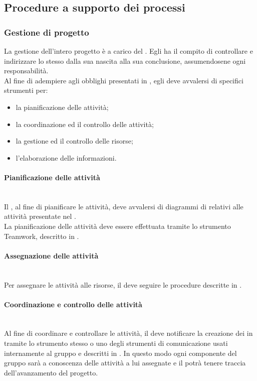 \subsection{Procedure a supporto dei processi}

\subsubsection{Gestione di progetto}
La gestione dell'intero progetto è a carico del \Responsabile. Egli ha il compito di controllare e indirizzare lo stesso dalla sua nascita alla sua conclusione, assumendosene ogni responsabilità.\\
Al fine di adempiere agli obblighi presentati in , egli deve avvalersi di specifici strumenti per:
\begin{itemize}
	\item la pianificazione delle attività;
	\item la coordinazione ed il controllo delle attività;
	\item la gestione ed il controllo delle risorse;
	\item l'elaborazione delle informazioni.
\end{itemize}

\paragraph{Pianificazione delle attività}\mbox{}\\
Il \Responsabile, al fine di pianificare le attività, deve avvalersi di diagrammi di  relativi alle attività presentate nel \PianoDiProgetto.\\
La pianificazione delle attività deve essere effettuata tramite lo strumento Teamwork, descritto in .

\paragraph{Assegnazione delle attività}\mbox{}\\
Per assegnare le attività alle risorse, il \Responsabile{} deve seguire le procedure descritte in .

\paragraph{Coordinazione e controllo delle attività}\mbox{}\\
Al fine di coordinare e controllare le attività, il \Responsabile{} deve notificare la creazione dei  in  tramite lo strumento stesso o uno degli strumenti di comunicazione usati internamente al gruppo e descritti in . In questo modo ogni componente del gruppo sarà a conoscenza delle attività a lui assegnate e il \Responsabile{} potrà tenere traccia dell'avanzamento del progetto.


